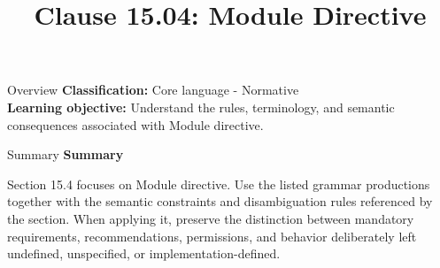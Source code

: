 \documentclass[10pt,letterpaper]{article}
\title{Clause 15.04: Module Directive}
\author{}
\date{}
\begin{document}
\maketitle
\begin{CornellOverviewBox}{Overview}
\textbf{Classification:} Core language - Normative\\[2pt]
\textbf{Learning objective:} Understand the rules, terminology, and semantic consequences associated with Module directive.
\end{CornellOverviewBox}\begin{CornellSummaryBox}{Summary}
{\sffamily\bfseries\color{Accent} Summary}\par\vspace{3pt}Section 15.4 focuses on Module directive. Use the listed grammar productions together with the semantic constraints and disambiguation rules referenced by the section. When applying it, preserve the distinction between mandatory requirements, recommendations, permissions, and behavior deliberately left undefined, unspecified, or implementation-defined.
\end{CornellSummaryBox}
\end{document}
